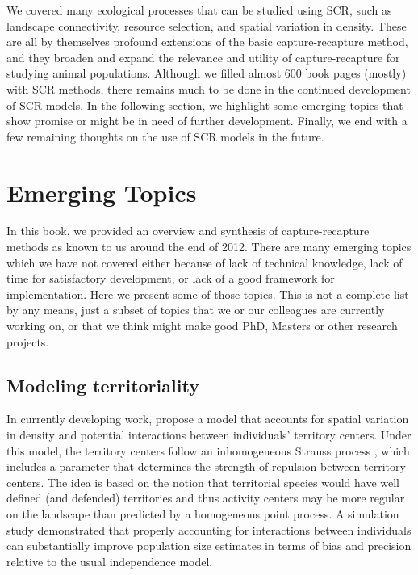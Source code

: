 We covered many ecological processes that can be studied using SCR,
such as landscape connectivity, resource selection, and spatial
variation in density. These are all by themselves profound extensions
of the basic capture-recapture method, and they broaden and expand the
relevance and utility of capture-recapture for studying animal
populations.  Although we filled almost 600 book pages (mostly) with
SCR methods, there remains much to be done in the continued
development of SCR models. In the following section, we highlight some
emerging topics that show promise or might be in need of further
development. Finally, we end with a few remaining thoughts on the use
of SCR models in the future.



\section{Emerging Topics}

In this book, we provided an overview and synthesis of
capture-recapture methods as known to us around the end of 2012. There
are many emerging topics which we have not covered either because of
lack of technical knowledge, lack of time for satisfactory
development, or lack of a good framework for implementation. Here we
present some of those topics. This is not a complete list by any
means, just a subset of topics that we or our colleagues are currently
working on, or that we think might make good PhD, Masters or other
research projects.


\subsection{Modeling territoriality}
\label{last.sec.ipp}

In currently developing work, \citet{reich_etal:2012} propose a model
that accounts for spatial variation in density and potential
interactions between individuals' territory centers.  Under this
model, the territory centers follow an inhomogeneous Strauss process
\citep{strauss:1975}, which includes a parameter that determines the
strength of repulsion between territory centers.  The idea is based on
the notion that territorial species would have well defined (and
defended) territories and thus activity centers may be more regular on
the landscape than predicted by a homogeneous point process.  A
simulation study demonstrated that properly accounting for
interactions between individuals can substantially improve population
size estimates in terms of bias and precision relative to the usual
independence model.


